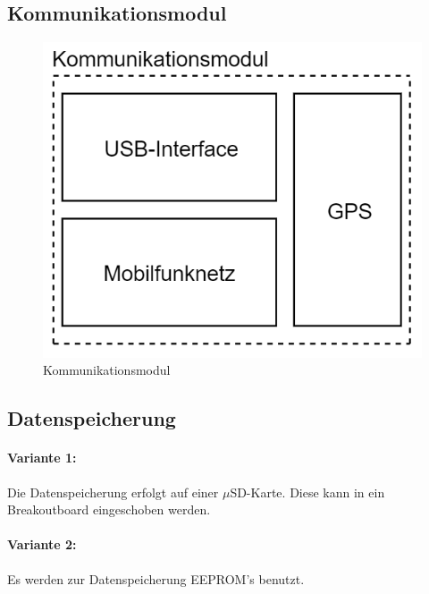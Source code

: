 %

\subsection{Kommunikationsmodul}
\begin{figure}[h]
\centering
\includegraphics[scale=0.7]{graphics/Kommunikationsmodul.PNG}
\caption{Kommunikationsmodul}
\end{figure}
\newpage
\subsection{Datenspeicherung}
\paragraph{Variante 1:}

Die Datenspeicherung erfolgt auf einer $\mu$SD-Karte. Diese kann in ein Breakoutboard eingeschoben werden.\\

\paragraph{Variante 2:}

Es werden zur Datenspeicherung EEPROM's benutzt.\\

